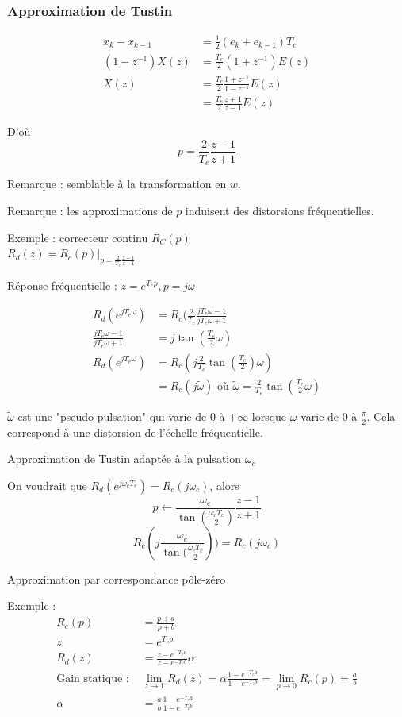 \documentclass[main.tex]{subfiles}
\begin{document}
\subsubsection*{Approximation de Tustin}
\begin{align*}
x_k - x_{k-1} & = \frac{1}{2}(e_k + e_{k-1})T_e \\
(1-z^{-1})X(z) & = \frac{T_e}{2}(1+z^{-1})E(z) \\
X(z) & = \frac{T_e}{2}\frac{1+z^{-1}}{1-z^{-1}}E(z) \\
& = \frac{T_e}{2}\frac{z+1}{z-1}E(z)
\end{align*}

D'où \[ \boxed{p = \frac{2}{T_e}\frac{z-1}{z+1}} \]

Remarque : semblable à la transformation en $w$.

Remarque : les approximations de $p$ induisent des distorsions fréquentielles.

Exemple : correcteur continu $R_C(p)$ \\
$R_d(z) = R_c(p) |_{p=\frac{2}{T_e} \frac{z-1}{z+1}}$

Réponse fréquentielle : $ z=e^{T_ep}, p=j\omega$

\begin{align*}
R_d(e^{jT_e\omega}) & = R_c(\frac{2}{T_e} \frac{jT_e\omega-1}{jT_e\omega+1}
\\
\frac{jT_e\omega-1}{jT_e\omega+1} & = j\tan(\frac{T_e}{2}\omega) \\
R_d(e^{jT_e\omega}) & = R_c(j\frac{2}{T_e} \tan(\frac{T_e}{2})\omega)
\\
& = R_c(j\tilde{\omega}) \text{ où } \tilde{\omega} = \frac{2}{T_e}\tan(\frac{T_e}{2}\omega)
\end{align*}

$\tilde{\omega}$ est une "pseudo-pulsation" qui varie de 0 à $+\infty$ lorsque $\omega$ varie de 0 à $\frac{\pi}{2}$. Cela correspond à une distorsion de l'échelle fréquentielle.

Approximation de Tustin adaptée à la pulsation $\omega_c$

On voudrait que $R_d(e^{j\omega_cT_e}) = R_c(j\omega_c)$, alors
\[p \leftarrow \frac{\omega_c}{\tan(\frac{\omega_cT_e}{2})}\frac{z-1}{z+1}\]
\[R_c(j\frac{\omega_c}{\tan(\frac{\omega_cT_e}{2}})) = R_c(j\omega_c)\]

Approximation par correspondance pôle-zéro

Exemple :
\begin{align*}
R_c(p) & = \frac{p+a}{p+b} \\
z & = e^{T_ep} \\
R_d(z) & = \frac{z-e^{-T_ea}}{z-e^{-T_eb}} \alpha \\
\text{Gain statique : } & \lim_{z\rightarrow1}R_d(z) = \alpha \frac{1-e^{-T_ea}}{1-e^{-T_eb}} = \lim_ {p\rightarrow 0} R_c(p) = \frac{a}{b} \\
\alpha & = \frac{a}{b} \frac{1-e^{-T_ea}}{1-e^{-T_eb}}
\end{align*}
\end{document}
